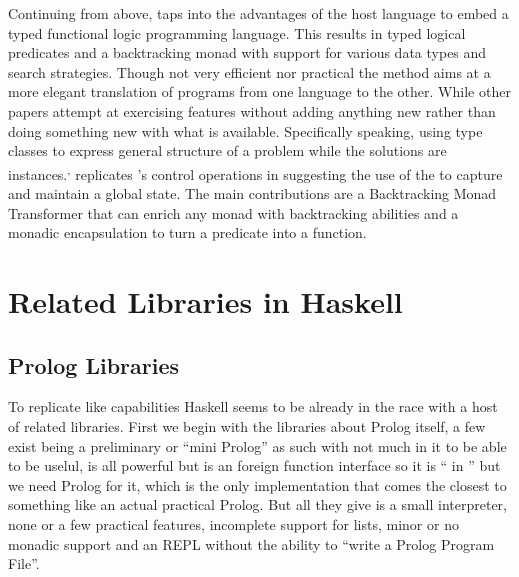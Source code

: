 \documentclass[thesis-solanki.tex]{subfiles}
\begin{document}
Continuing from above, \cite{claessen2000typed} taps into the advantages of the host language to embed a typed
functional logic programming language.
This results in typed logical predicates and a backtracking monad with support for various data types and search
strategies.
Though not very efficient nor practical the method aims at a more elegant translation of programs from one language
to the other.
While other papers \cite{erwig2004escape} attempt at exercising  features without adding
anything new rather than doing something new with what is available.
Specifically speaking, using  type classes to express general structure of a problem while the
solutions are instances.\textsuperscript{,}
\cite{hinze1998prological} replicates 's control operations in  suggesting the
use of the   to capture and maintain a global state.
The main contributions are a Backtracking Monad Transformer that can enrich any monad with backtracking abilities
and a monadic encapsulation to turn a  predicate into a  function.



\section{Related Libraries in Haskell}
\subsection{Prolog Libraries}

To replicate  like
capabilities Haskell seems to be already in the race
with a host of related libraries.
First we begin with the libraries about Prolog itself, a few exist \cite{nanoprolog-lib} being a preliminary or
``mini Prolog'' as such with not much in it to be able to be uselul, \cite{hswip-lib} is all powerful but is an
foreign function interface so it is `` in '' but we need Prolog for it,
\cite{prolog-lib} which is the only implementation that comes the closest to something like an actual practical
Prolog.
But all they give is a small interpreter, none or a few practical features, incomplete support for lists, minor or
no monadic support and an REPL without the ability to ``write a Prolog Program File''.
\end{document}
